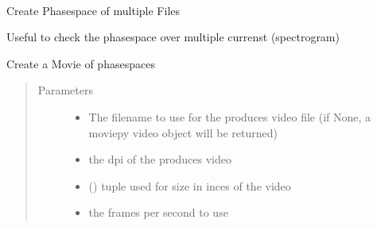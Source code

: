\documentclass[letterpaper,10pt,openany,oneside,english]{sphinxmanual}
\begin{document}
\begin{fulllineitems}
\label{\detokenize{plots:plots.MultiPhaseSpaceMovie}}~
\begin{DUlineblock}{0em}
\item[] Create Phasespace of multiple Files  
\item[] Useful to check the phasespace over multiple currenst (spectrogram)  
\end{DUlineblock}

\begin{fulllineitems}
\label{\detokenize{plots:plots.MultiPhaseSpaceMovie.__init__}}
\end{fulllineitems}


\begin{fulllineitems}
\label{\detokenize{plots:plots.MultiPhaseSpaceMovie.create_movie}}
Create a Movie of phasespaces
\begin{quote}\begin{description}
\item[{Parameters}] \leavevmode\begin{itemize}
\item {} 
 \textendash{} The filename to use for the produces video file  
(if None, a moviepy video object will be returned)

\item {} 
\sphinxstyleliteralstrong{(}\sphinxstyleliteralstrong{)} \textendash{} the dpi of the produces video

\item {} 
\sphinxstyleliteralstrong{)} (\sphinxstyleliteralemphasis{(}\sphinxstyleliteralemphasis{,}) \textendash{} tuple used for size in inces of the video

\item {} 
\sphinxstyleliteralstrong{(}\sphinxstyleliteralstrong{)} \textendash{} the frames per second to use


\end{itemize}
\end{description}
\end{quote}
\end{fulllineitems}
\end{fulllineitems}
\end{document}
